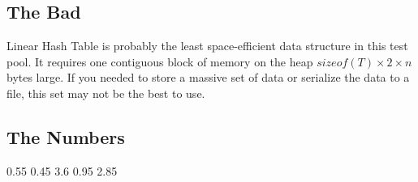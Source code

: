 \documentclass{muformallab}
\begin{document}
  \subsection{The Bad}

  Linear Hash Table is probably the least space-efficient data structure
  in this test pool. It requires one contiguous block of memory on the
  heap $sizeof(T) \times 2 \times n$ bytes large. If you needed to store
  a massive set of data or serialize the data to a file, this set may not
  be the best to use.

  \subsection{The Numbers}

   {0.55} {0.45} {3.6} {0.95} {2.85}
\end{document}
